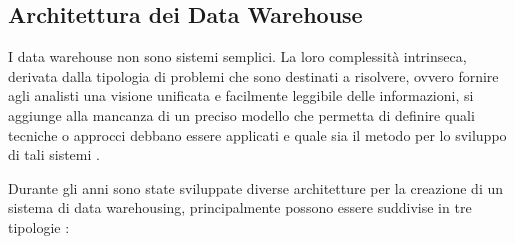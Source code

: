 \subsection{Architettura dei Data Warehouse}

I data warehouse non sono sistemi semplici. La loro complessità intrinseca, derivata dalla tipologia di problemi che sono destinati a risolvere, ovvero fornire agli analisti una visione unificata e facilmente leggibile delle informazioni, si aggiunge alla mancanza di un preciso modello che permetta di definire quali tecniche o approcci debbano essere applicati e quale sia il metodo per lo sviluppo di tali sistemi \cite{kelly_data_warehousing_in_action}.

Durante gli anni sono state sviluppate diverse architetture per la creazione di un sistema di data warehousing, principalmente possono essere suddivise in tre tipologie \cite{interviewbit_data_warehouse_architecture}:

